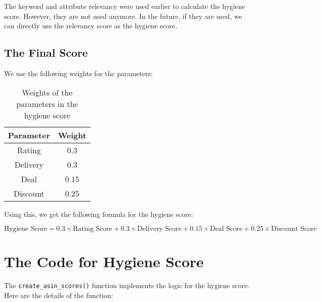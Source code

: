 The keyword and attribute relevancy were used earlier to calculate the hygiene score. However, they are not used anymore. In the future, if they are used, we can directly use the relevancy score as the hygiene score.

\subsection{The Final Score}

We use the following weights for the parameters:

\begin{table}[h]
    \centering
    \begin{tabular}{|c|c|}
        \hline
        Parameter & Weight \\
        \hline
        Rating    & 0.3    \\
        Delivery  & 0.3    \\
        Deal      & 0.15   \\
        Discount  & 0.25   \\
        \hline
    \end{tabular}
    \caption{Weights of the parameters in the hygiene score}
    \label{tab:hygiene_weights}
\end{table}

Using this, we get the following formula for the hygiene score:

\begin{equation*}
    \text{Hygiene Score} = 0.3 \times \text{Rating Score} + 0.3 \times \text{Delivery Score} + 0.15 \times \text{Deal Score} + 0.25 \times \text{Discount Score}
\end{equation*}

\section{The Code for Hygiene Score}
The \texttt{create\_asin\_scores()} function implements the logic for the hygiene score. Here are the details of the function:

